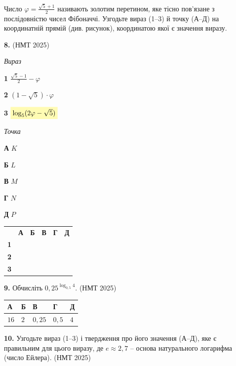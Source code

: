 \documentclass[14pt]{extarticle}
\newcommand{\answerGrid}{
    \begingroup
    \renewcommand{\arraystretch}{1.3} 
    \setlength{\tabcolsep}{7pt} 
    \begin{tabular}{r|c|c|c|c|c|}
         \multicolumn{1}{c}{} & \multicolumn{1}{c}{\textbf{А}} & \multicolumn{1}{c}{\textbf{Б}} & \multicolumn{1}{c}{\textbf{В}} & \multicolumn{1}{c}{\textbf{Г}} & \multicolumn{1}{c}{\textbf{Д}} \\ \cline{2-6}
         \textbf{1} & & & & & \\ \cline{2-6}
         \textbf{2} & & & & & \\ \cline{2-6}
         \textbf{3} & & & & & \\ \cline{2-6}
    \end{tabular}
    \endgroup
}
\newcommand{\matchingLayout}[3]{
    \noindent
    \begin{minipage}[t]{0.40\textwidth}
        #1
    \end{minipage}%
    \hfill
    \begin{minipage}[t]{0.28\textwidth}
        #2
    \end{minipage}%
    \hfill
    \begin{minipage}[t]{0.30\textwidth}
        \vspace{0pt}
        \begin{flushright}
        #3
        \end{flushright}
    \end{minipage}
}
\newcommand{\answerTable}[5]{
\begin{center}
\begin{tabular}{|*{5}{>{\centering\arraybackslash}m{2.8cm}|}}
\hline
\rule[-0.3cm]{0pt}{0.8cm}\textbf{А} & \textbf{Б} & \textbf{В} & \textbf{Г} & \textbf{Д} \\
\hline
\rule[-0.4cm]{0pt}{1.0cm}#1 & \rule[-0.4cm]{0pt}{1.0cm}#2 & \rule[-0.4cm]{0pt}{1.0cm}#3 & \rule[-0.4cm]{0pt}{1.0cm}#4 & \rule[-0.4cm]{0pt}{1.0cm}#5 \\
\hline
\end{tabular}
\end{center}
}
\newcommand{\nmtyear}[1]{\hfill{\small\color{yearcolor}(НМТ #1)}}
\begin{document}
\vspace{0.8cm}

\noindent Число $\varphi = \displaystyle\frac{\sqrt{5} + 1}{2}$ називають золотим перетином, яке тісно пов'язане з послідовністю чисел Фібоначчі. Узгодьте вираз (1--3) й точку (А--Д) на координатній прямій (див. рисунок), координатою якої є значення виразу.

\noindent\textbf{8.} \nmtyear{2025}
\vspace{0.3cm}

\begin{center}
\end{center}

\vspace{0.3cm}

\matchingLayout{\textit{Вираз}

\textbf{1} \quad $\displaystyle\frac{\sqrt{5} - 1}{2} - \varphi$

\textbf{2} \quad $(1 - \sqrt{5}) \cdot \varphi$

\textbf{3} \quad $\colorbox{yellow!30}{$\log_5 (2\varphi - \sqrt{5})$}$
}{
\textit{Точка}

\textbf{А} \quad $K$

\textbf{Б} \quad $L$

\textbf{В} \quad $M$

\textbf{Г} \quad $N$

\textbf{Д} \quad $P$
}{
\answerGrid
}

\vspace{0.8cm}

\noindent\textbf{9.} Обчисліть $0{,}25^{\log_{0,5} 4}$. \nmtyear{2025}
\vspace{0.3cm}

\answerTable{$16$}{$2$}{$0{,}25$}{$0{,}5$}{$4$}

\vspace{0.5cm}

\noindent\textbf{10.} Узгодьте вираз (1--3) і твердження про його значення (А--Д), яке є правильним для цього виразу, де $e \approx 2{,}7$ -- основа натурального логарифма (число Ейлера). \nmtyear{2025}
\vspace{0.3cm}
\end{document}
